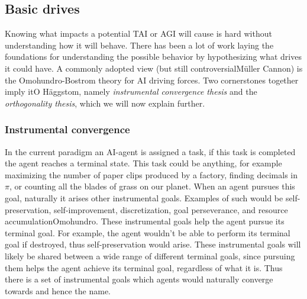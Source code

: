 \documentclass[12pt,A4]{report}
\newcommand{\autobaj}{}
\theoremstyle{definition}
\begin{document}
\subsection{Basic drives}
Knowing what impacts a potential TAI or AGI will cause is hard without understanding how it will behave. There has been a lot of work laying the foundations for understanding the possible behavior by hypothesizing what drives it could have. A commonly adopted view (but still controversial\autobaj{Müller Cannon}) is the Omohundro-Bostrom theory for AI driving forces. Two cornerstones together imply it\autobaj{O Häggstom}, namely \textit{instrumental convergence thesis} and the \textit{orthogonality thesis}, which we will now explain further.

\subsubsection{Instrumental convergence}
In the current paradigm an AI-agent is assigned a task, if this task is completed the agent reaches a terminal state. This task could be anything, for example maximizing the number of paper clips produced by a factory, finding decimals in $\pi$, or counting all the blades of grass on our planet. When an agent pursues this goal, naturally it arises other instrumental goals. Examples of such would be self-preservation, self-improvement, discretization, goal perseverance, and resource accumulation\autobaj{Omohundro}. These instrumental goals help the agent pursue its terminal goal. For example, the agent wouldn't be able to perform its terminal goal if destroyed, thus self-preservation would arise. These instrumental goals will likely be shared between a wide range of different terminal goals, since pursuing them helps the agent achieve its terminal goal, regardless of what it is. Thus there is a set of instrumental goals which agents would naturally converge towards and hence the name. 
\end{document}
